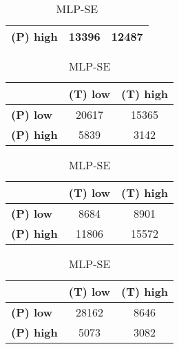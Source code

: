 \begin{landscape}
\begin{table}[htbp]
\begin{minipage}{.3\textwidth}
\begin{tabular}{|l|c|c|}
\textbf{(P) high}	& 13396				& 12487				\\ \hline
\end{tabular}
\end{minipage}\hfill
\begin{minipage}{.3\textwidth}
\tiny
\caption*{MLP-AT}
\begin{tabular}{|l|c|c|}
\hline
					& \textbf{(T) low}	& \textbf{(T) high}	\\ \hline
\textbf{(P) low}	& 20617				& 15365				\\ \hline
\textbf{(P) high}	& 5839				& 3142				\\ \hline
\end{tabular}
\end{minipage}\hfill
\begin{minipage}{.3\textwidth}
\tiny
\caption*{MLP-PL}
\begin{tabular}{|l|c|c|}
\hline
					& \textbf{(T) low}	& \textbf{(T) high}	\\ \hline
\textbf{(P) low}	& 8684				& 8901				\\ \hline
\textbf{(P) high}	& 11806				& 15572				\\ \hline
\end{tabular}
\end{minipage}\hfill
\begin{minipage}{.3\textwidth}
\tiny
\caption*{MLP-SE}
\begin{tabular}{|l|c|c|}
\hline
					& \textbf{(T) low}	& \textbf{(T) high}	\\ \hline
\textbf{(P) low}	& 28162				& 8646				\\ \hline
\textbf{(P) high}	& 5073				& 3082				\\ \hline
\end{tabular}
\end{minipage}\hfill
\end{table}
\end{landscape}